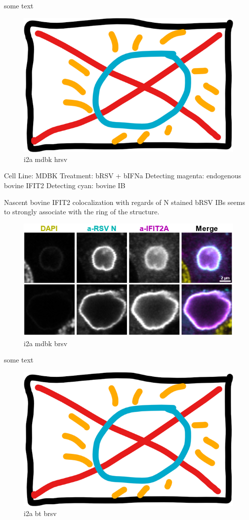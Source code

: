 some text

\begin{figure}
    \centering
    \includegraphics[width=0.5\linewidth]{09. Chapter 4//Figs//01. I2A/00. placeholder.png}
    \caption[i2a mdbk hrsv]{i2a mdbk hrsv}
    \label{i2a mdbk hrsv}
\end{figure}

Cell Line: MDBK \newline
Treatment: bRSV + bIFNa \newline
Detecting magenta: endogenous bovine IFIT2  \newline
Detecting cyan: bovine IB \newline

Nascent bovine IFIT2 colocalization with regards of N stained bRSV IBs seems to strongly associate with the ring of the structure.

\begin{figure}
    \centering
    \includegraphics[width=1\linewidth]{09. Chapter 4//Figs//01. I2A/08. i2a mdbk brsv.png}
    \caption[i2a mdbk brsv]{i2a mdbk brsv}
    \label{i2a mdbk brsv}
\end{figure}

some text

\begin{figure}
    \centering
    \includegraphics[width=0.5\linewidth]{09. Chapter 4//Figs//01. I2A/00. placeholder.png}
    \caption[i2a bt brsv]{i2a bt brsv}
    \label{i2a bt brsv}
\end{figure}


